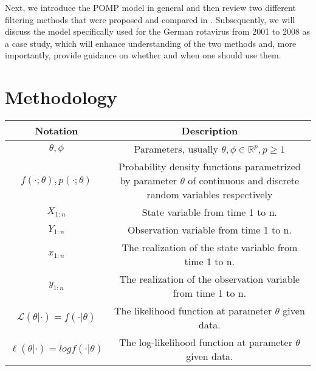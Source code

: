 \documentclass[10pt]{article}
\begin{document}
Next, we introduce the POMP model in general and then review two different filtering methods that were proposed and compared in \cite{wwr}. Subsequently, we will discuss the model specifically used for the German rotavirus from 2001 to 2008 as a case study, which will enhance understanding of the two methods and, more importantly, provide guidance on whether and when one should use them.




\section{Methodology}


\begin{center}
\begin{tabular}{|c c|} 
 \hline
 Notation & Description  \\ [0.5ex] 
 \hline
 $\theta, \phi$ & Parameters, usually $\theta, \phi \in \mathds{R}^p, p\geq 1$\\ 
 \hline
 $f(\cdot; \theta),p(\cdot; \theta)$ & \makecell{Probability density functions parametrized by parameter $\theta$ of \\continuous and discrete random variables respectively}  \\
 \hline
 $X_{1:n}$ & State variable from time 1 to n.  \\
 \hline
 $Y_{1:n}$ & Observation variable from time 1 to n. \\
 \hline
 $x_{1:n}$ & The realization of the state variable from time 1 to n.  \\
 \hline
 $y_{1:n}$ & The realization of the observation variable from time 1 to n.  \\
 \hline
 $\mathcal{L}(\theta|\cdot)=f(\cdot|\theta)$ & The likelihood function at parameter $\theta$ given data.  \\
 \hline
 $\ell(\theta|\cdot)=logf(\cdot|\theta)$ & The log-likelihood function at parameter $\theta$ given data.  \\
 \hline
\end{tabular}
\end{center}
\end{document}
